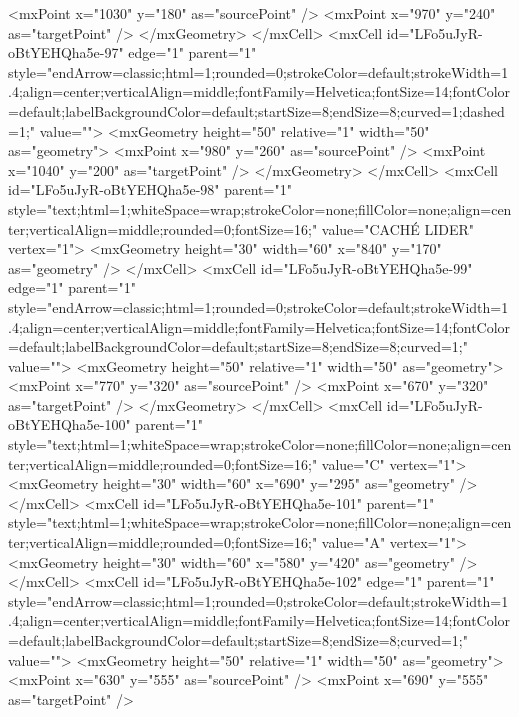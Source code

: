             <mxPoint x="1030" y="180" as="sourcePoint" />
            <mxPoint x="970" y="240" as="targetPoint" />
          </mxGeometry>
        </mxCell>
        <mxCell id="LFo5uJyR-oBtYEHQha5e-97" edge="1" parent="1" style="endArrow=classic;html=1;rounded=0;strokeColor=default;strokeWidth=1.4;align=center;verticalAlign=middle;fontFamily=Helvetica;fontSize=14;fontColor=default;labelBackgroundColor=default;startSize=8;endSize=8;curved=1;dashed=1;" value="">
          <mxGeometry height="50" relative="1" width="50" as="geometry">
            <mxPoint x="980" y="260" as="sourcePoint" />
            <mxPoint x="1040" y="200" as="targetPoint" />
          </mxGeometry>
        </mxCell>
        <mxCell id="LFo5uJyR-oBtYEHQha5e-98" parent="1" style="text;html=1;whiteSpace=wrap;strokeColor=none;fillColor=none;align=center;verticalAlign=middle;rounded=0;fontSize=16;" value="CACHÉ LIDER" vertex="1">
          <mxGeometry height="30" width="60" x="840" y="170" as="geometry" />
        </mxCell>
        <mxCell id="LFo5uJyR-oBtYEHQha5e-99" edge="1" parent="1" style="endArrow=classic;html=1;rounded=0;strokeColor=default;strokeWidth=1.4;align=center;verticalAlign=middle;fontFamily=Helvetica;fontSize=14;fontColor=default;labelBackgroundColor=default;startSize=8;endSize=8;curved=1;" value="">
          <mxGeometry height="50" relative="1" width="50" as="geometry">
            <mxPoint x="770" y="320" as="sourcePoint" />
            <mxPoint x="670" y="320" as="targetPoint" />
          </mxGeometry>
        </mxCell>
        <mxCell id="LFo5uJyR-oBtYEHQha5e-100" parent="1" style="text;html=1;whiteSpace=wrap;strokeColor=none;fillColor=none;align=center;verticalAlign=middle;rounded=0;fontSize=16;" value="C" vertex="1">
          <mxGeometry height="30" width="60" x="690" y="295" as="geometry" />
        </mxCell>
        <mxCell id="LFo5uJyR-oBtYEHQha5e-101" parent="1" style="text;html=1;whiteSpace=wrap;strokeColor=none;fillColor=none;align=center;verticalAlign=middle;rounded=0;fontSize=16;" value="A" vertex="1">
          <mxGeometry height="30" width="60" x="580" y="420" as="geometry" />
        </mxCell>
        <mxCell id="LFo5uJyR-oBtYEHQha5e-102" edge="1" parent="1" style="endArrow=classic;html=1;rounded=0;strokeColor=default;strokeWidth=1.4;align=center;verticalAlign=middle;fontFamily=Helvetica;fontSize=14;fontColor=default;labelBackgroundColor=default;startSize=8;endSize=8;curved=1;" value="">
          <mxGeometry height="50" relative="1" width="50" as="geometry">
            <mxPoint x="630" y="555" as="sourcePoint" />
            <mxPoint x="690" y="555" as="targetPoint" />
